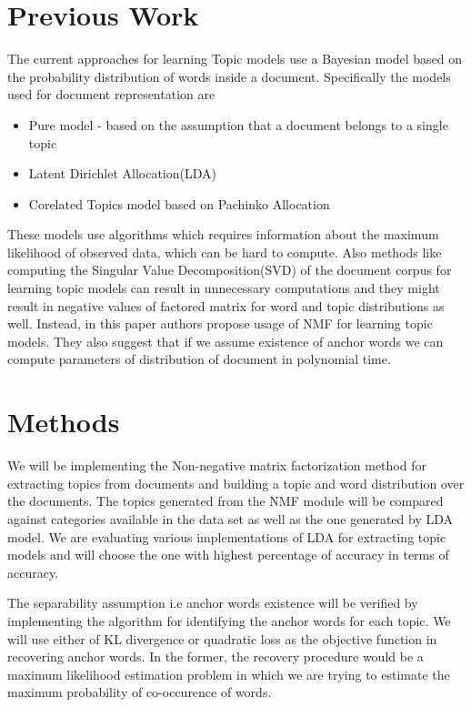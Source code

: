 \documentclass[a4paper,11pt]{article}
\begin{document}
\section{Previous Work}

The current approaches for learning Topic models use a Bayesian model based on the probability distribution of words inside a document{\cite{blei}}. Specifically the models used for document representation are

\begin{itemize} 
\item Pure model - based on the assumption that a document belongs to a single topic
\item Latent Dirichlet Allocation(LDA)
\item Corelated Topics model based on Pachinko Allocation
\end{itemize}

These models use algorithms which requires information about the maximum likelihood of observed data, which can be hard to compute. Also methods like computing the Singular Value Decomposition(SVD) of the document corpus for learning topic models can result in unnecessary computations and they might result in negative values of factored matrix for word and topic distributions as well. Instead, in this paper authors propose usage of NMF for learning topic models. They also suggest that if we assume existence of anchor words we can compute parameters of distribution of document in polynomial time. 

\section{Methods}


We will be implementing the Non-negative matrix factorization method for extracting topics from documents and building a topic and word distribution over the documents. The topics generated from the NMF module will be compared against categories available in the data set as well as the one generated by LDA model. We are evaluating various implementations of LDA for extracting topic models and will choose the one with highest percentage of accuracy in terms of accuracy. 

The separability assumption i.e anchor words existence will be verified by implementing the algorithm for identifying the anchor words for each topic. We will use either of KL divergence or quadratic loss as the objective function in recovering anchor words. In the former, the recovery procedure would be a maximum likelihood estimation problem in which we are trying to estimate the maximum probability of co-occurence of words. 
\end{document}
